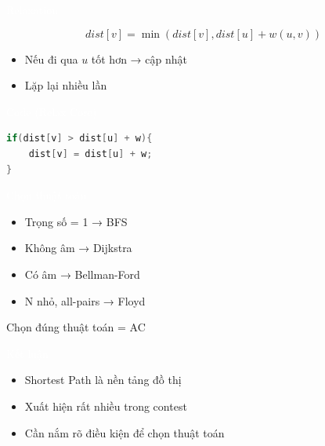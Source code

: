 \documentclass{beamer}
\newcommand{\hlblue}[1]{\textcolor{myblue}{#1}}
\newcommand{\hlgreen}[1]{\textcolor{mygreen}{#1}}
\newcommand{\hlred}[1]{\textcolor{myred}{#1}}
\newcommand{\hlpurple}[1]{\textcolor{mypurple}{#1}}
\newcommand{\hlcyan}[1]{\textcolor{mycyan}{#1}}
\newcommand{\hlwhite}[1]{\textcolor{white}{#1}}
\begin{document}

\begin{frame}{\hlwhite{Relaxation}}
\begin{tcolorbox}
\centering
\[
dist[v] = \min(dist[v], dist[u] + w(u,v))
\]
\end{tcolorbox}

\begin{itemize}
\item Nếu đi qua $u$ tốt hơn → cập nhật
\item Lặp lại nhiều lần
\end{itemize}
\end{frame}


\begin{frame}[fragile]{\hlwhite{Code (Relax Core)}}
\begin{lstlisting}[language=C++]
if(dist[v] > dist[u] + w){
    dist[v] = dist[u] + w;
}
\end{lstlisting}
\end{frame}


\begin{frame}{\hlwhite{Chọn thuật toán}}
\begin{itemize}
\item Trọng số = 1 → \hlblue{BFS}
\item Không âm → \hlgreen{Dijkstra}
\item Có âm → \hlred{Bellman-Ford}
\item N nhỏ, all-pairs → \hlpurple{Floyd}
\end{itemize}

\begin{tcolorbox}
\centering
\hlcyan{Chọn đúng thuật toán = AC}
\end{tcolorbox}
\end{frame}


\begin{frame}{\hlwhite{Kết luận}}
\begin{itemize}
\item Shortest Path là nền tảng đồ thị
\item Xuất hiện rất nhiều trong contest
\item Cần nắm rõ điều kiện để chọn thuật toán
\end{itemize}
\end{frame}
\end{document}
